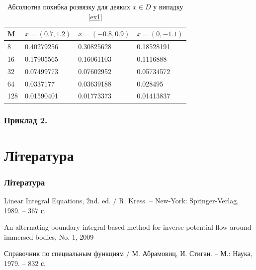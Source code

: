 \documentclass{beamer}
\numberwithin{equation}{section}
\begin{document}
	\begin{frame}
	
	\begin{table}
		\begin{tabular}{l l l l}
			\toprule
			\textbf{M} & $x = (0.7, 1.2)$ & $x = (-0.8, 0.9)$  & $x = (0, -1.1)$  \\
			\midrule
			8 & 0.40279256 & 0.30825628& 0.18528191 \\			
			16 & 0.17905565 & 0.16061103 & 0.1116888 \\
			32 & 0.07499773&  0.07602952 & 0.05734572 \\
			64 & 0.0337177 & 0.03639188 & 0.028495 \\
			128 & 0.01590401 & 0.01773373 & 0.01413837 \\
			\bottomrule
		\end{tabular}
		\caption{Абсолютна похибка розвязку для деяких $x \in D$ у випадку \ref{ex1} }
	\end{table}
\end{frame}
	
	\begin{frame}
		\frametitle{Приклад 2.}
	\end{frame}
	
	
\section*{Література}
\begin{frame}
	\thispagestyle{empty}
	\frametitle{Література}
	\begin{thebibliography}{99}
		

		Linear Integral Equations, 2nd. ed. / R. Kress. -- 
		New-York: Springer-Verlag, 1989. -- 367 с.
		
		An alternating boundary integral based method for inverse potential flow around immersed bodies, No. 1, 2009

		Справочник по специальным функциям / М. Абрамовиц, И. Стиган. 
		-- М.: Наука, 1979. -- 832 с.

	\end{thebibliography}
\end{frame}

	

	
\end{document}
